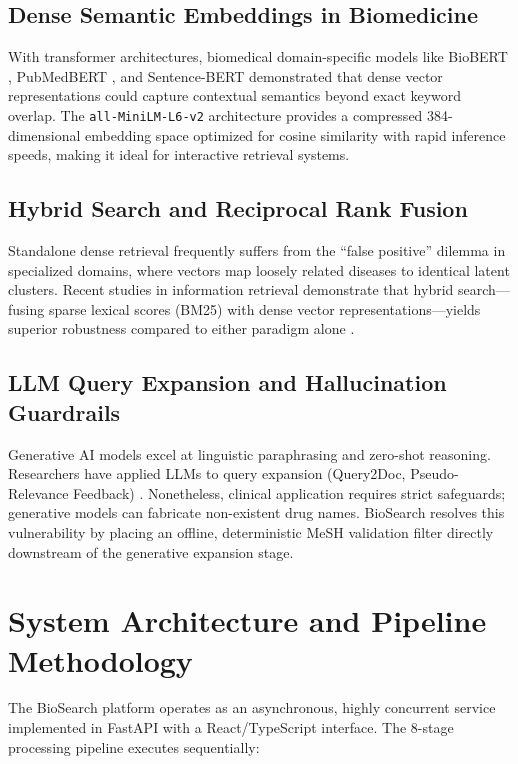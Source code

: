 \documentclass[conference]{IEEEtran}
\begin{document}
\subsection{Dense Semantic Embeddings in Biomedicine}
With transformer architectures, biomedical domain-specific models like BioBERT \cite{lee_biobert}, PubMedBERT \cite{gu_pubmedbert}, and Sentence-BERT \cite{reimers_sbert} demonstrated that dense vector representations could capture contextual semantics beyond exact keyword overlap. The \texttt{all-MiniLM-L6-v2} architecture provides a compressed 384-dimensional embedding space optimized for cosine similarity with rapid inference speeds, making it ideal for interactive retrieval systems.

\subsection{Hybrid Search and Reciprocal Rank Fusion}
Standalone dense retrieval frequently suffers from the ``false positive'' dilemma in specialized domains, where vectors map loosely related diseases to identical latent clusters. Recent studies in information retrieval demonstrate that hybrid search---fusing sparse lexical scores (BM25) with dense vector representations---yields superior robustness compared to either paradigm alone \cite{cormack_rrf}.

\subsection{LLM Query Expansion and Hallucination Guardrails}
Generative AI models excel at linguistic paraphrasing and zero-shot reasoning. Researchers have applied LLMs to query expansion (Query2Doc, Pseudo-Relevance Feedback) \cite{wang_query2doc}. Nonetheless, clinical application requires strict safeguards; generative models can fabricate non-existent drug names. BioSearch resolves this vulnerability by placing an offline, deterministic MeSH validation filter directly downstream of the generative expansion stage.

\section{System Architecture and Pipeline Methodology}

The BioSearch platform operates as an asynchronous, highly concurrent service implemented in FastAPI with a React/TypeScript interface. The 8-stage processing pipeline executes sequentially:
\end{document}
